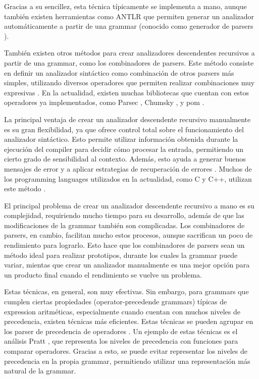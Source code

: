 Gracias a su sencillez, esta técnica típicamente se implementa a mano, aunque
también existen herramientas como ANTLR \parencite{ANTLR} que permiten generar
un analizador automáticamente a partir de una \gls{grammar} (conocido como
generador de \glspl{parser} \parencite{dragon-book}).

También existen otros métodos para crear analizadores descendentes
recursivos a partir de una \gls{grammar}, como los combinadores de
\glspl{parser}. Este método consiste en definir un analizador sintáctico como
combinación de otros \glspl{parser} más simples, utilizando diversos operadores
que permiten realizar combinaciones muy expresivas
\parencite{parser-combinators}. En la actualidad, existen muchas bibliotecas que
cuentan con estos operadores ya implementados, como Parsec \parencite{parsec}, Chumsky
\parencite{chumsky}, y pom \parencite{pom}.

La principal ventaja de crear un analizador descendente recursivo manualmente es su
gran flexibilidad, ya que ofrece control total sobre el funcionamiento del
analizador sintáctico. Esto permite utilizar información obtenida durante la
ejecución del \gls{compiler} para decidir cómo procesar la entrada, permitiendo
un cierto grado de sensibilidad al contexto. Además, esto ayuda a generar buenos
mensajes de error y a aplicar estrategias de recuperación de errores
\parencite{errors-clang}. Muchos de los \glspl{programming language} utilizados
en la actualidad, como C y C++, utilizan este método
\parencite{parser-types-survey}.

El principal problema de crear un analizador descendente recursivo a mano es su
complejidad, requiriendo mucho tiempo para su desarrollo, además de que las
modificaciones de la \gls{grammar} también son complicadas. Los combinadores de
\glspl{parser}, en cambio, facilitan mucho estos procesos, aunque sacrifican un
poco de rendimiento para lograrlo. Esto hace que los combinadores de
\glspl{parser} sean un método ideal para realizar prototipos, durante los cuales
la \gls{grammar} puede variar, mientas que crear un analizador manualmente es
una mejor opción para un producto final cuando el rendimiento se vuelve un
problema.

Estas técnicas, en general, son muy efectivas. Sin embargo, para \glspl{grammar}
que cumplen ciertas propiedades (\glspl{operator-precedende grammar}) típicas de
\gls{expression} aritméticas, especialmente cuando cuentan con muchos niveles de
precedencia, existen técnicas más eficientes. Estas técnicas se pueden agrupar
en los \gls{parser} de precedencia de operadores
\parencite{operator-precedence-parser}. Un ejemplo de estas técnicas es el
análisis Pratt \parencite{pratt-parsing-paper}
\parencite{pratt-parsing-example}, que representa los niveles de precedencia con
funciones para comparar operadores. Gracias a esto, se puede evitar representar los niveles de
precedencia en la propia \gls{grammar}, permitiendo utilizar una representación
más natural de la \gls{grammar}.

